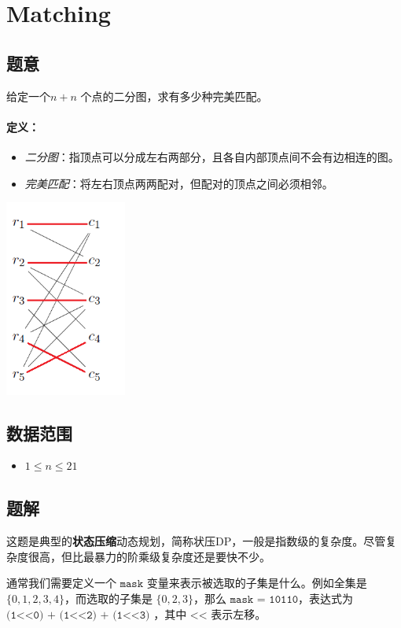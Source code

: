 \section{Matching}
\subsection*{题意}
给定一个$ n+n$ 个点的二分图，求有多少种完美匹配。

\paragraph{定义：}
\begin{itemize}
\item \textit{二分图}：指顶点可以分成左右两部分，且各自内部顶点间不会有边相连的图。
\item \textit{完美匹配}：将左右顶点两两配对，但配对的顶点之间必须相邻。
\end{itemize}


\begin{center}
\includegraphics[width=4cm]{./Pics/Perfect Matching.png}
\end{center}
\subsection*{数据范围}
\begin{itemize}
\item $1 \leq n \leq 21$
\end{itemize}

\subsection*{题解}
这题是典型的\textbf{状态压缩}动态规划，简称状压DP，一般是指数级的复杂度。尽管复杂度很高，但比最暴力的阶乘级复杂度还是要快不少。

通常我们需要定义一个 $\texttt{mask}$ 变量来表示被选取的子集是什么。例如全集是 $\{0,1,2,3,4\}$，而选取的子集是 $\{0,2,3\}$，那么 $\texttt{mask = 10110}$，表达式为 $\texttt{(1<<0) + (1<<2) + (1<<3)}$
，其中 $\texttt{<<}$ 表示左移。

